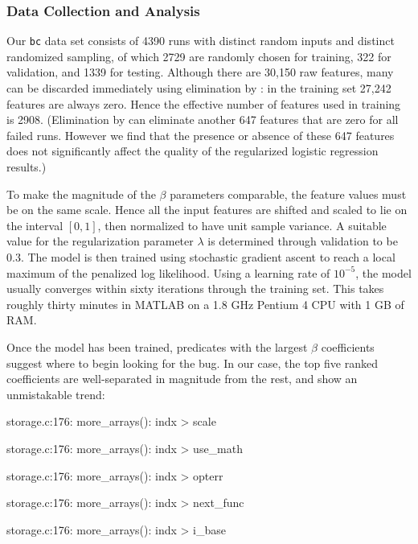 \subsubsection{Data Collection and Analysis}

Our \texttt{bc} data set consists of 4390 runs with distinct random
inputs and distinct randomized  sampling, of which
2729 are randomly chosen for training, 322 for validation, and 1339
for testing.  Although there are 30,150 raw features, many can be
discarded immediately using elimination by :
in the training set 27,242 features are always zero.  Hence the
effective number of features used in training is 2908.  (Elimination
by  can eliminate another 647 features
that are zero for all failed runs.  However we find that the presence
or absence of these 647 features does not significantly affect the
quality of the regularized logistic regression results.)

To make the magnitude of the $\beta$ parameters comparable, the feature
values must be on the same scale.  Hence all the input features are
shifted and scaled to lie on the interval $[0, 1]$, then normalized to
have unit sample variance.  A suitable value for the regularization
parameter $\lambda$ is determined through validation to be $0.3$.  The model
is then trained using stochastic gradient ascent to reach a local
maximum of the penalized log likelihood.  Using a learning rate of
$10^{-5}$, the model usually converges within sixty iterations through
the training set.  This takes roughly thirty minutes in MATLAB on a
1.8 GHz Pentium 4 CPU with 1 GB of RAM.

Once the model has been trained, predicates with the largest $\beta$
coefficients suggest where to begin looking for the bug.  In our case,
the top five ranked coefficients are well-separated in magnitude from
the rest, and show an unmistakable trend:

\begin{features}
\item storage.c:176: more\_arrays(): indx > scale
\item storage.c:176: more\_arrays(): indx > use\_math
\item storage.c:176: more\_arrays(): indx > opterr
\item storage.c:176: more\_arrays(): indx > next\_func
\item storage.c:176: more\_arrays(): indx > i\_base
\end{features}

